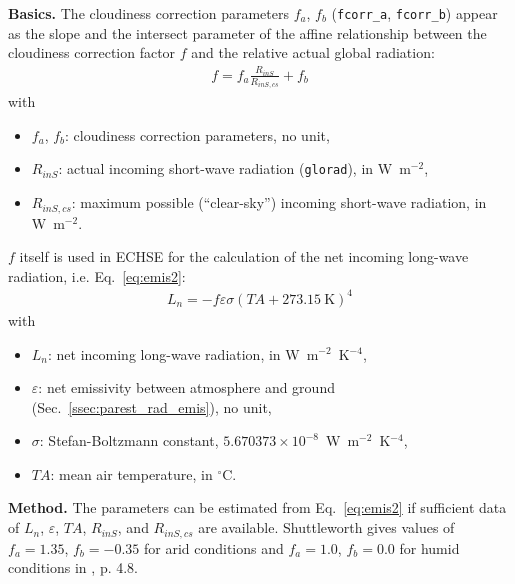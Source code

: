 \documentclass{scrreprt}
\newenvironment{denseitem}{
  \begin{itemize}
    \setlength{\itemsep}{0pt}
    \setlength{\parskip}{0pt}
    \setlength{\parsep}{0pt}
}{
  \end{itemize}
}
\begin{document}
\textbf{Basics.}
The cloudiness correction parameters $f_a$, $f_b$ (\verb!fcorr_a!, \verb!fcorr_b!) appear as the slope and the intersect parameter of the affine relationship between the cloudiness correction factor $f$ and the relative actual global radiation:
\begin{align} \label{eq:fcorr1}
  f = f_a \frac{R_{inS}}{R_{inS,cs}} + f_b
\end{align}
%
with
\begin{denseitem}
  \item[] $f_a$, $f_b$: cloudiness correction parameters, no unit,
  \item[] $R_{inS}$: actual incoming short-wave radiation (\verb!glorad!), in W~m$^{-2}$,
  \item[] $R_{inS,cs}$: maximum possible (``clear-sky'') incoming short-wave radiation, in W~m$^{-2}$.
\end{denseitem}
%
$f$ itself is used in ECHSE for the calculation of the net incoming long-wave radiation, i.e. Eq.~\eqref{eq:emis2}:
\begin{align*}
  L_n = -f \varepsilon \sigma (TA + 273.15~\text{K})^4
\end{align*}
%
with
\begin{denseitem}
  \item[] $L_n$: net incoming long-wave radiation, in W~m$^{-2}$~K$^{-4}$,
  \item[] $\varepsilon$: net emissivity between atmosphere and ground (Sec.~\ref{ssec:parest_rad_emis}), no unit,
  \item[] $\sigma$: Stefan-Boltzmann constant, $5.670373 \times 10^{-8}$~W~m$^{-2}$~K$^{-4}$,
  \item[] $TA$: mean air temperature, in $^\circ$C.
\end{denseitem}

\textbf{Method.}
The parameters can be estimated from Eq.~\eqref{eq:emis2} if sufficient data of $L_n$, $\varepsilon$, $TA$, $R_{inS}$, and $R_{inS,cs}$ are available.
Shuttleworth gives values of $f_a = 1.35$, $f_b = -0.35$ for arid conditions and $f_a = 1.0$, $f_b = 0.0$ for humid conditions in \citet{maidment93}, p. 4.8.
\end{document}
